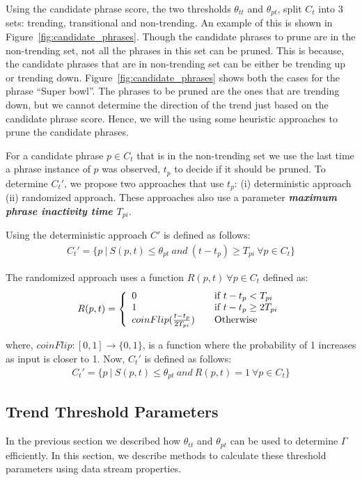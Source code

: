 \documentclass{sig-alternate}
\begin{document}
Using the candidate phrase score, the two thresholds $\theta_{tt}$ and $\theta_{pt}$, split $C_t$ into 3 sets: trending, transitional and non-trending. An example of this is shown in Figure~\ref{fig:candidate_phrases}. Though the  candidate phrases to prune are in the non-trending set, not all the phrases in this set can be pruned. This is because, the candidate phrases that are in non-trending set can be either be trending up or trending down.  Figure~\ref{fig:candidate_phrases} shows both the cases for the phrase ``Super bowl''. The phrases to be pruned are the ones that are trending down, but we cannot determine the direction of the trend just based on the candidate phrase score. Hence, we will the using some heuristic approaches to prune the candidate phrases.

For a candidate phrase $p \in C_t$ that is in the non-trending set we use the last time a phrase instance of $p$ was observed, $t_p$ to decide if it should be pruned.  To  determine $C_{t}'$, we propose two approaches that use $t_p$:  (i) deterministic approach (ii) randomized approach. 
These approaches also use a parameter \textit{\textbf{maximum phrase inactivity time $T_{pi}$}}.

\medskip Using the deterministic approach $C'$ is defined as follows:
\begin{align}
C_{t}' =  \{p\ |\ S(p, t) \leq \theta_{pt} \ and\ (t - t_p) \geq T_{pi}\    \forall p \in C_t\} 
\label{eq:deterministic-prune}
\end{align}

The randomized approach uses a function $R(p, t)\  \forall p \in C_t$ defined as:
\[
  R(p, t) = \left\{ 
  \begin{array}{l l}
    0 & \quad \text{if $t-t_p < T_{pi}$}\\
    1 & \quad \text{if $t-t_p \geq 2T_{pi}$}\\
   coinFlip(\frac{t-t_p}{2T_{pi}}) & \quad \text{Otherwise}\\
  \end{array} \right.
\]

\noindent where, $coinFlip: [0, 1] \rightarrow \{0, 1\} $, is a function where the probability of 1 increases as input is closer to 1. Now, $C_{t}'$ is defined as follows:
\begin{align}
C_{t}' =  \{p\ |\ S(p, t) \leq \theta_{pt} \ and\ R(p, t)=1 \    \forall p \in C_t\} 
\label{eq:randomized-prune}
\end{align}

\subsection{Trend Threshold Parameters} 
In the previous section we described how $\theta_{tt}$ and $\theta_{pt}$ can be used to determine $\Gamma$ efficiently. In this section, we describe methods to calculate these threshold parameters using data stream properties.
\end{document}
